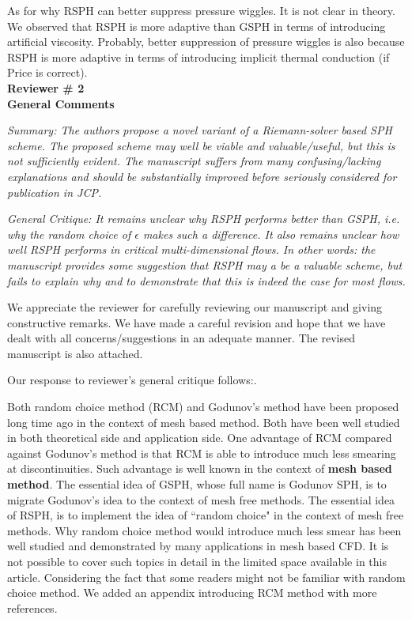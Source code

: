 \documentclass[10pt,a4paper]{article}
\begin{document}
As for why RSPH can better suppress pressure wiggles. It is not clear in theory. We observed that RSPH is more adaptive than GSPH in terms of introducing artificial viscosity. Probably, better suppression of pressure wiggles is also because RSPH is more adaptive in terms of introducing implicit thermal conduction (if Price is correct). 
\\[12pt]

\textbf{\Large Reviewer \# 2}\\[3pt]

\textbf{\large General Comments}

\textit{Summary: The authors propose a novel variant of a Riemann-solver based SPH scheme. The proposed scheme may well be viable and valuable/useful, but this is not sufficiently evident. The manuscript suffers from many confusing/lacking explanations and should be
substantially improved before seriously considered for publication in JCP.}

\textit{General Critique:
It remains unclear why RSPH performs better than GSPH, i.e. why the random choice of $\epsilon$ makes such a difference. It also remains unclear how well RSPH performs in critical multi-dimensional flows. In other words: the manuscript provides some suggestion that RSPH may a be a valuable scheme, but fails to explain why and to demonstrate that this is indeed the case for most flows.}

We appreciate the reviewer for carefully reviewing our manuscript and giving constructive remarks. 
We have made a careful revision and hope that we have dealt with all concerns/suggestions in an adequate manner. 
The revised manuscript is also attached.

Our response to reviewer's general critique follows:. 

Both random choice method (RCM) and Godunov's method have been proposed long time ago in the context of mesh based method. Both have been well studied in both theoretical side and application side. One advantage of RCM compared against Godunov's method is that RCM is able to introduce much less smearing at discontinuities. Such advantage is well known in the context of \textbf{mesh based method}.
The essential idea of GSPH, whose full name is Godunov SPH, is to migrate Godunov's idea to the context of mesh free methods. The essential idea of RSPH, is to implement the idea of ``random choice" in the context of mesh free methods. Why random choice method would introduce much less smear has been well studied and demonstrated by many applications in mesh based CFD. It is not possible to cover such topics in detail in the limited space available in this article.
Considering the fact that some readers might not be familiar with random choice method. We added an appendix introducing RCM method with more references.
\end{document}
